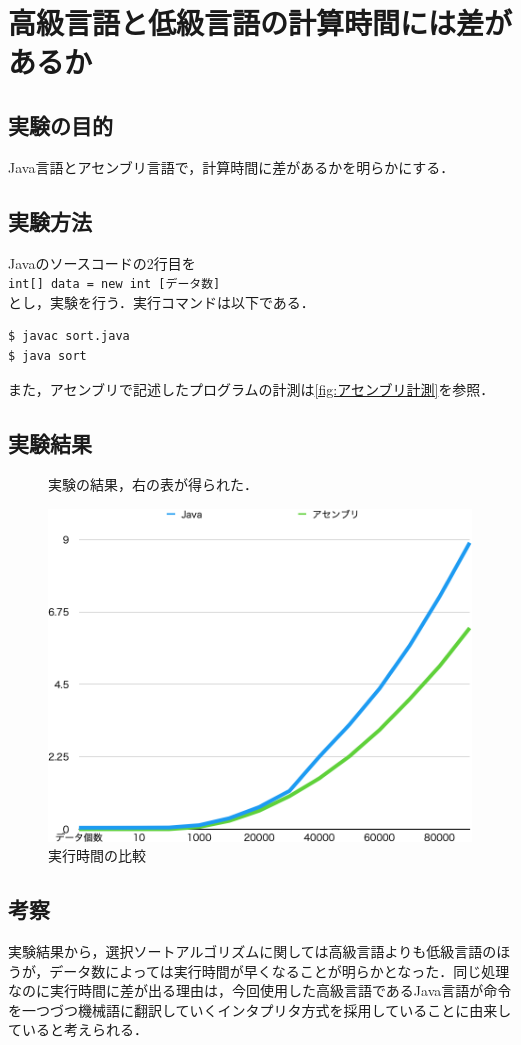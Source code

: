 \chapter{高級言語と低級言語の計算時間には差があるか}
\vspace{-1cm}
\section{実験の目的}
Java言語とアセンブリ言語で，計算時間に差があるかを明らかにする．

\section{実験方法}
Javaのソースコードの2行目を\\
\verb+int[] data = new int [データ数]+\\
とし，実験を行う．実行コマンドは以下である．
\begin{lstlisting}[numbers={none},caption={Javaコンパイル，実行時間の計測}]
$ javac sort.java
$ java sort
\end{lstlisting}
また，アセンブリで記述したプログラムの計測は\ref{fig:アセンブリ計測}を参照．

\section{実験結果}
\begin{figure}[htbp]
  \centering
  \begin{minipage}{0.45\textwidth}
    実験の結果，右の表が得られた．
  \end{minipage}
  \begin{minipage}{0.45\textwidth}
    \caption{実行時間の比較}
    \label{fig:実行時間の比較}
    \includegraphics[scale=0.45]{Sec4.png}
    \end{minipage}
\end{figure}

\section{考察}
実験結果から，選択ソートアルゴリズムに関しては高級言語よりも低級言語のほうが，データ数によっては実行時間が早くなることが明らかとなった．同じ処理なのに実行時間に差が出る理由は，今回使用した高級言語であるJava言語が命令を一つづつ機械語に翻訳していくインタプリタ方式を採用していることに由来していると考えられる．
